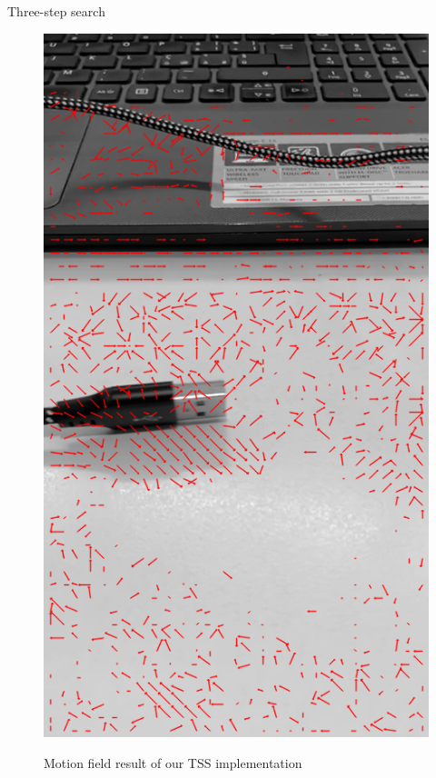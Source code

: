 \documentclass[aspectratio=1610,xcolor=dvipsnames]{beamer}
\begin{document}
\begin{frame}{Three-step search}
\begin{figure}[H]
\begin{minipage}{.45\textwidth}
            \includegraphics[keepaspectratio, width=.55\linewidth]{images/bbme-1-res.png}
            \label{fig:bbme-1-res}
		\end{minipage}
        \label{fig:bbme-1}
        \caption{Motion field result of our TSS implementation}
	\end{figure}
\end{frame}
\end{document}

